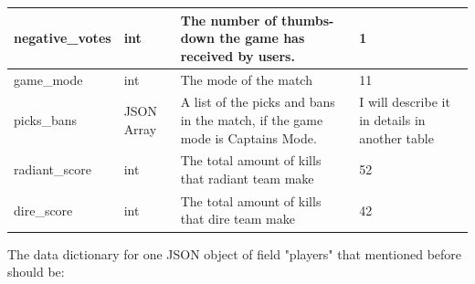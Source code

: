 \documentclass{article}
\begin{document}
\begin{tabular}{|p{3cm}|p{2cm}|p{5cm}|p{3cm}|}
\hline
negative\_votes & int & The number of thumbs-down the game has received by users. & 1 \\
\hline
game\_mode & int & The mode of the match & 11 \\
\hline
picks\_bans & JSON Array & A list of the picks and bans in the match, if the game mode is Captains Mode. & I will describe it in details in another table \\
\hline
radiant\_score & int & The total amount of kills that radiant team make & 52 \\
\hline
dire\_score & int & The total amount of kills that dire team make & 42 \\
\hline
\end{tabular}

The data dictionary for one JSON object of field "players" that mentioned before should be: \\
\end{document}
